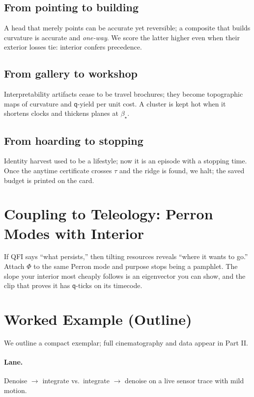 \documentclass[11pt]{article}
\newcommand{\1}{\mathbf{1}}
\newcommand{\Blur}{\beta}
\newcommand{\PhiField}{\Phi}
\newcommand{\Qualon}{\mathsf{q}}        %
\begin{document}
\subsection*{From pointing to building}
A head that merely points can be accurate yet reversible; a composite that builds curvature is accurate and \emph{one-way}. We score the latter higher even when their exterior losses tie: interior confers precedence.

\subsection*{From gallery to workshop}
Interpretability artifacts cease to be travel brochures; they become topographic maps of curvature and \(\Qualon\)-yield per unit cost. A cluster is kept hot when it shortens clocks and thickens planes at \(\Blur_\star\).

\subsection*{From hoarding to stopping}
Identity harvest used to be a lifestyle; now it is an episode with a stopping time. Once the anytime certificate crosses \(\tau\) and the ridge is found, we halt; the saved budget is printed on the card.

\section{Coupling to Teleology: Perron Modes with Interior}
If QFI says ``what persists,'' then tilting resources reveals ``where it wants to go.'' Attach \(\PhiField\) to the same Perron mode and purpose stops being a pamphlet. The slope your interior most cheaply follows is an eigenvector you can show, and the clip that proves it has \(\Qualon\)-ticks on its timecode.

\section{Worked Example (Outline)}
We outline a compact exemplar; full cinematography and data appear in Part II.

\paragraph{Lane.} Denoise \(\to\) integrate vs.\ integrate \(\to\) denoise on a live sensor trace with mild motion.
\end{document}
